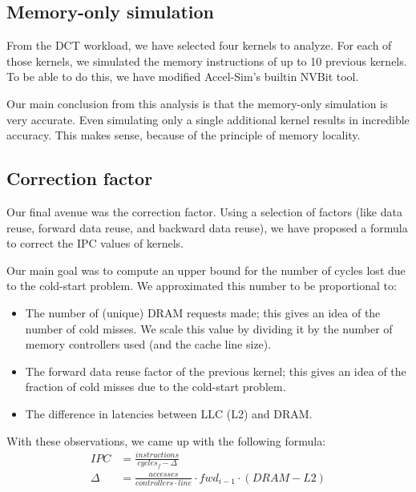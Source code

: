 \subsection{Memory-only simulation}\label{subsec:memory-only-simulation}
From the DCT workload, we have selected four kernels to analyze.
For each of those kernels, we simulated the memory instructions of up to 10 previous kernels.
To be able to do this, we have modified Accel-Sim's builtin NVBit tool.

Our main conclusion from this analysis is that the memory-only simulation is very accurate.
Even simulating only a single additional kernel results in incredible accuracy.
This makes sense, because of the principle of memory locality.

\subsection{Correction factor}\label{subsec:correction-factor}
Our final avenue was the correction factor.
Using a selection of factors (like data reuse, forward data reuse, and backward data reuse), we have proposed a formula to correct the IPC values of kernels.

Our main goal was to compute an upper bound for the number of cycles lost due to the cold-start problem.
We approximated this number to be proportional to:
\begin{itemize}
    \item The number of (unique) DRAM requests made; this gives an idea of the number of cold misses.
    We scale this value by dividing it by the number of memory controllers used (and the cache line size).
    \item The forward data reuse factor of the previous kernel; this gives an idea of the fraction of cold misses due to the cold-start problem.
    \item The difference in latencies between LLC (L2) and DRAM\@.
\end{itemize}

With these observations, we came up with the following formula:
\begin{align}
    IPC &= \frac{instructions}{cycles_f - \Delta} \\
    \Delta &= \frac{accesses}{controllers \cdot line} \cdot fwd_{i-1} \cdot (DRAM - L2)
\end{align}

